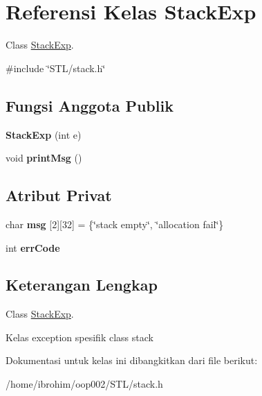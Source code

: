 \hypertarget{classStackExp}{}\section{Referensi Kelas Stack\+Exp}
\label{classStackExp}


Class \hyperlink{classStackExp}{Stack\+Exp}.  




{\ttfamily \#include \char`\"{}S\+T\+L/stack.\+h\char`\"{}}

\subsection*{Fungsi Anggota Publik}
\begin{DoxyCompactItemize}
\item 
\hypertarget{classStackExp_a2590e6d22201f3c187d83bf9e626b6e2}{}{\bfseries Stack\+Exp} (int e)\label{classStackExp_a2590e6d22201f3c187d83bf9e626b6e2}

\item 
\hypertarget{classStackExp_a8d3e08d13c04cd4577899971cbda6094}{}void {\bfseries print\+Msg} ()\label{classStackExp_a8d3e08d13c04cd4577899971cbda6094}

\end{DoxyCompactItemize}
\subsection*{Atribut Privat}
\begin{DoxyCompactItemize}
\item 
\hypertarget{classStackExp_a065c66d237d3a2c3fb544d22c57beb66}{}char {\bfseries msg} \mbox{[}2\mbox{]}\mbox{[}32\mbox{]} = \{\char`\"{}stack empty\char`\"{}, \char`\"{}allocation fail\char`\"{}\}\label{classStackExp_a065c66d237d3a2c3fb544d22c57beb66}

\item 
\hypertarget{classStackExp_a07937b691416e6b9945f238d9ff585c0}{}int {\bfseries err\+Code}\label{classStackExp_a07937b691416e6b9945f238d9ff585c0}

\end{DoxyCompactItemize}


\subsection{Keterangan Lengkap}
Class \hyperlink{classStackExp}{Stack\+Exp}. 

Kelas exception spesifik class stack 

Dokumentasi untuk kelas ini dibangkitkan dari file berikut\+:\begin{DoxyCompactItemize}
\item 
/home/ibrohim/oop002/\+S\+T\+L/stack.\+h\end{DoxyCompactItemize}
